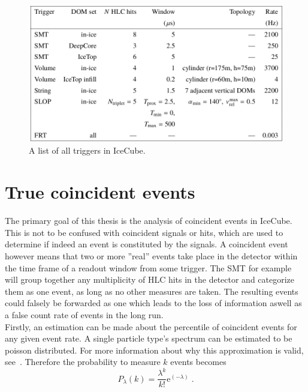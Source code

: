 \begin{figure}[htbp]
    \centering
    \includegraphics[width=\textwidth]{content/pictures/trigger_list.png}
    \caption{A list of all triggers in IceCube.}\label{fig:triggers}
\end{figure}

\section{True coincident events}\label{sec:coin}

The primary goal of this thesis is the analysis of coincident events in IceCube. This is not to be confused with coincident signals or hits, which are used 
to determine if indeed an event is constituted by the signals. A coincident event however means that two or more ''real'' events take place in the detector within the 
time frame of a readout window from some trigger. The SMT for example will group together any multiplicity of HLC hits in the detector and categorize them as one
event, as long as no other measures are taken. The resulting events could falsely be forwarded as one which leads to the loss of information aswell as 
a false count rate of events in the long run. \\
Firstly, an estimation can be made about the percentile of coincident events for any given event rate. A single particle type's spectrum can be 
estimated to be poisson distributed. For more information about why this approximation is valid, see~\cite{einstein}. Therefore the  probability to measure $k$ events 
becomes\\ 

\begin{equation}
    P_{\lambda}(k) = \frac{\lambda^k}{k!}\text{e}^(-\lambda) \; .
\end{equation}\\

